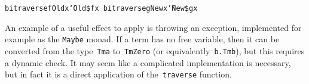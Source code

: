 \documentclass[9pt,authoryear]{sigplanconf}
\begin{document}
{{}\vphantom{$\{$}}\texttt{bitraverse}\texttt{\mbox{\hspace{0.50em}}}\texttt{f}\texttt{\mbox{\hspace{0.50em}}}\texttt{\makebox[1.22ex][c]{\_{}}}\texttt{\mbox{\hspace{0.50em}}}\texttt{\makebox[1.22ex][l]{$ {(} $}}\texttt{Old}\texttt{\mbox{\hspace{0.50em}}}\texttt{x}\texttt{\makebox[1.22ex][r]{$ {)} $}}\texttt{\mbox{\hspace{0.50em}}}\texttt{{\char `\=}}\texttt{\mbox{\hspace{0.50em}}}\texttt{Old}\texttt{\mbox{\hspace{0.50em}}}\texttt{\makebox[1.22ex][c]{\textless{}}\${}\makebox[1.22ex][c]{\textgreater{}}}\texttt{\mbox{\hspace{0.50em}}}\texttt{f}\texttt{\mbox{\hspace{0.50em}}}\texttt{x}\texttt{{\nopagebreak \newline%
}\vphantom{$\{$}}\texttt{bitraverse}\texttt{\mbox{\hspace{0.50em}}}\texttt{\makebox[1.22ex][c]{\_{}}}\texttt{\mbox{\hspace{0.50em}}}\texttt{g}\texttt{\mbox{\hspace{0.50em}}}\texttt{\makebox[1.22ex][l]{$ {(} $}}\texttt{New}\texttt{\mbox{\hspace{0.50em}}}\texttt{x}\texttt{\makebox[1.22ex][r]{$ {)} $}}\texttt{\mbox{\hspace{0.50em}}}\texttt{{\char `\=}}\texttt{\mbox{\hspace{0.50em}}}\texttt{New}\texttt{\mbox{\hspace{0.50em}}}\texttt{\makebox[1.22ex][c]{\textless{}}\${}\makebox[1.22ex][c]{\textgreater{}}}\texttt{\mbox{\hspace{0.50em}}}\texttt{g}\texttt{\mbox{\hspace{0.50em}}}\texttt{x}\texttt{{\nopagebreak \newline%
}\vphantom{$\{$}}%


%
An example of a useful effect to apply is throwing an exception,
    implemented for example as the \texttt{Maybe} monad. If a term has no
    free variable, then it can be converted from the type{~}\texttt{Tm}\texttt{\mbox{\hspace{0.50em}}}\texttt{a}    to{~}\texttt{Tm}\texttt{\mbox{\hspace{0.50em}}}\texttt{Zero} (or equivalently{~}\texttt{\makebox[1.22ex][c]{$ \forall $}}\texttt{\mbox{\hspace{0.50em}}}\texttt{b}\texttt{.}\texttt{\mbox{\hspace{0.50em}}}\texttt{Tm}\texttt{\mbox{\hspace{0.50em}}}\texttt{b}), but this requires a dynamic
    check. It may seem like a complicated implementation is necessary,
    but in fact it is a direct application of the{~}\texttt{traverse}    function.%
\end{document}
